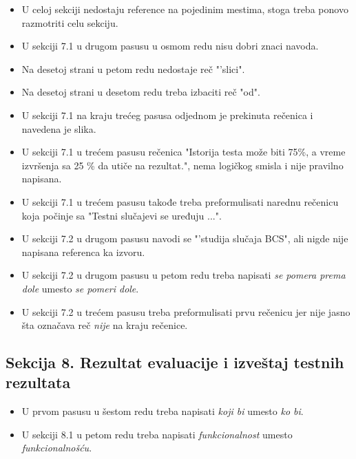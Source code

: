 \documentclass[a4paper]{report}
\begin{document}
\begin{itemize}
\item U celoj sekciji nedostaju reference 
na pojedinim mestima, stoga treba ponovo razmotriti celu sekciju.

\item U sekciji 7.1 u drugom pasusu u osmom redu nisu dobri znaci navoda.

\item Na desetoj strani u petom redu nedostaje reč "'slici".

\item Na desetoj strani u desetom redu treba izbaciti reč "od".

\item U sekciji 7.1 na kraju trećeg pasusa odjednom je prekinuta rečenica i navedena je slika. 

\item U sekciji 7.1 u trećem pasusu rečenica "Istorija testa može biti 75\%, a vreme izvršenja sa 25 \% da utiče na rezultat.", nema logičkog smisla i nije pravilno napisana. 

\item U sekciji 7.1 u trećem pasusu takođe treba preformulisati narednu rečenicu koja počinje sa "Testni slučajevi se uređuju ...".

\item U sekciji 7.2 u drugom pasusu navodi se "'studija slučaja BCS", ali nigde nije napisana referenca ka izvoru.

\item U sekciji 7.2 u drugom pasusu u petom redu treba napisati \textit{se pomera prema dole} umesto \textit{se pomeri dole}.


\item U sekciji 7.2 u trećem pasusu treba preformulisati prvu rečenicu jer nije jasno šta označava reč  \textit{nije} na kraju rečenice. 

\end{itemize}


\subsection{Sekcija 8. Rezultat evaluacije i izveštaj testnih rezultata}

\begin{itemize}

\item U prvom pasusu u šestom redu treba napisati  \textit{koji bi} umesto  \textit{ko bi}.

\item U sekciji 8.1 u petom redu treba napisati  \textit{funkcionalnost} umesto  \textit{funkcionalnošću}.

\end{itemize}
\end{document}
